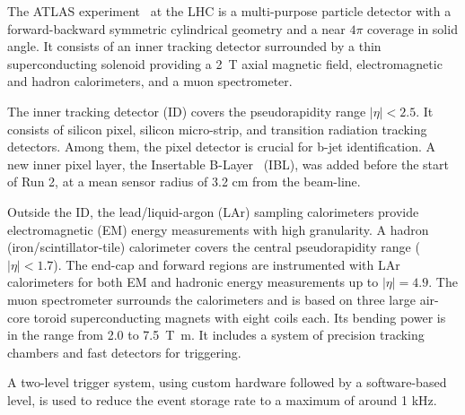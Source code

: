 The ATLAS experiment~\cite{PERF-2007-01} at the LHC is a multi-purpose particle detector
with a forward-backward symmetric cylindrical geometry and a near $4\pi$ coverage in 
solid angle.
It consists of an inner tracking detector surrounded by a thin superconducting solenoid
providing a \SI{2}{\tesla} axial magnetic field, electromagnetic and hadron calorimeters, and a muon spectrometer.

The inner tracking detector (ID) covers the pseudorapidity range $|\eta| < 2.5$.
It consists of silicon pixel, silicon micro-strip, and transition radiation tracking detectors.
Among them, the pixel detector is crucial for b-jet identification. A new inner pixel layer, the Insertable B-Layer~\cite{IBL, IBL_perf} (IBL), was added before the start of 
Run 2, at a mean sensor radius of 3.2 cm from the beam-line. 

Outside the ID, the lead/liquid-argon (LAr) sampling calorimeters provide electromagnetic (EM) energy measurements
with high granularity.
A hadron (iron/scintillator-tile) calorimeter covers the central pseudorapidity range ($|\eta| < 1.7$).
The end-cap and forward regions are instrumented with LAr calorimeters
for both EM and hadronic energy measurements up to $|\eta| = 4.9$.
The muon spectrometer surrounds the calorimeters and is based on
three large air-core toroid superconducting magnets with eight coils each.
Its bending power is in the range from \num{2.0} to \SI{7.5}{\tesla\metre}.
It includes a system of precision tracking chambers and fast detectors for triggering.

A two-level trigger system, using custom
hardware followed by a software-based level, is used to reduce the event storage rate to a maximum of
around 1 kHz.
